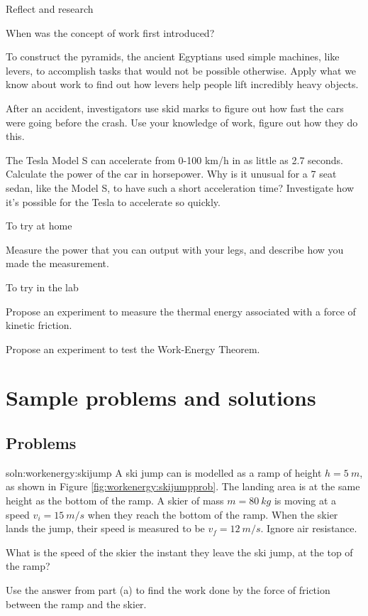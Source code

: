 \begin{chapteractivity}{Reflect and research}
{
\item When was the concept of work first introduced?
\item To construct the pyramids, the ancient Egyptians used simple machines, like levers, to accomplish tasks that would not be possible otherwise. Apply what we know about work to find out how levers help people lift incredibly heavy objects. 
\item After an accident, investigators use skid marks to figure out how fast the cars were going before the crash. Use your knowledge of work, figure out how they do this.
\item The Tesla Model S can accelerate from 0-100 \si{km/h} in as little as 2.7 seconds. Calculate the power of the car in horsepower. Why is it unusual for a 7 seat sedan, like the Model S, to have such a short acceleration time? Investigate how it's possible for the Tesla to accelerate so quickly. 
}
\end{chapteractivity}

\begin{chapteractivity}{To try at home}
{
\item Measure the power that you can output with your legs, and describe how you made the measurement.
}
\end{chapteractivity}

\begin{chapteractivity}{To try in the lab}
{
\item Propose an experiment to measure the thermal energy associated with a force of kinetic friction. 
\item Propose an experiment to test the Work-Energy Theorem.
}
\end{chapteractivity}
\newpage
\section{Sample problems and solutions}
\subsection{Problems}
\begin{problemParts}{soln:workenergy:skijump}{\label{prob:workenergy:skijump} A ski jump can is modelled as a ramp of height $h=\SI{5}{m}$, as shown in Figure \ref{fig:workenergy:skijumpprob}. The landing area is at the same height as the bottom of the ramp. A skier of mass $m=\SI{80}{kg}$ is moving at a speed $v_i=\SI{15}{m/s}$ when they reach the bottom of the ramp. When the skier lands the jump, their speed is measured to be $v_f=\SI{12}{m/s}$. Ignore air resistance. 
}
\item What is the speed of the skier the instant they leave the ski jump, at the top of the ramp?
\item Use the answer from part (a) to find the work done by the force of friction between the ramp and the skier.
\end{problemParts}


